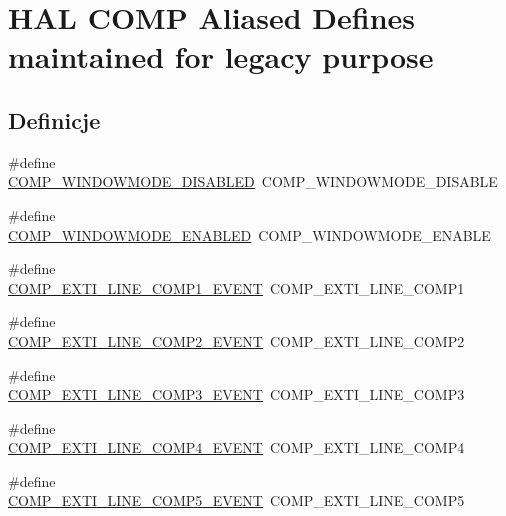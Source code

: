 \hypertarget{group___h_a_l___c_o_m_p___aliased___defines}{}\section{H\+AL C\+O\+MP Aliased Defines maintained for legacy purpose}
\label{group___h_a_l___c_o_m_p___aliased___defines}
\subsection*{Definicje}
\begin{DoxyCompactItemize}
\item 
\#define \hyperlink{group___h_a_l___c_o_m_p___aliased___defines_gab9e0400639ad2179b63e519e08741c05}{C\+O\+M\+P\+\_\+\+W\+I\+N\+D\+O\+W\+M\+O\+D\+E\+\_\+\+D\+I\+S\+A\+B\+L\+ED}~C\+O\+M\+P\+\_\+\+W\+I\+N\+D\+O\+W\+M\+O\+D\+E\+\_\+\+D\+I\+S\+A\+B\+LE
\item 
\#define \hyperlink{group___h_a_l___c_o_m_p___aliased___defines_gab481c80a4a4235ca54d2dd39db70926c}{C\+O\+M\+P\+\_\+\+W\+I\+N\+D\+O\+W\+M\+O\+D\+E\+\_\+\+E\+N\+A\+B\+L\+ED}~C\+O\+M\+P\+\_\+\+W\+I\+N\+D\+O\+W\+M\+O\+D\+E\+\_\+\+E\+N\+A\+B\+LE
\item 
\#define \hyperlink{group___h_a_l___c_o_m_p___aliased___defines_gaa53df1592afaa8d2a7d2f417273a50a7}{C\+O\+M\+P\+\_\+\+E\+X\+T\+I\+\_\+\+L\+I\+N\+E\+\_\+\+C\+O\+M\+P1\+\_\+\+E\+V\+E\+NT}~C\+O\+M\+P\+\_\+\+E\+X\+T\+I\+\_\+\+L\+I\+N\+E\+\_\+\+C\+O\+M\+P1
\item 
\#define \hyperlink{group___h_a_l___c_o_m_p___aliased___defines_gae128dfe3b90b2c0e51cde7de5987f9ef}{C\+O\+M\+P\+\_\+\+E\+X\+T\+I\+\_\+\+L\+I\+N\+E\+\_\+\+C\+O\+M\+P2\+\_\+\+E\+V\+E\+NT}~C\+O\+M\+P\+\_\+\+E\+X\+T\+I\+\_\+\+L\+I\+N\+E\+\_\+\+C\+O\+M\+P2
\item 
\#define \hyperlink{group___h_a_l___c_o_m_p___aliased___defines_ga30c7118ab9b9cbfa8e40870ee9e747b6}{C\+O\+M\+P\+\_\+\+E\+X\+T\+I\+\_\+\+L\+I\+N\+E\+\_\+\+C\+O\+M\+P3\+\_\+\+E\+V\+E\+NT}~C\+O\+M\+P\+\_\+\+E\+X\+T\+I\+\_\+\+L\+I\+N\+E\+\_\+\+C\+O\+M\+P3
\item 
\#define \hyperlink{group___h_a_l___c_o_m_p___aliased___defines_ga7e682dbcdc2deedaa2b2854b7256b742}{C\+O\+M\+P\+\_\+\+E\+X\+T\+I\+\_\+\+L\+I\+N\+E\+\_\+\+C\+O\+M\+P4\+\_\+\+E\+V\+E\+NT}~C\+O\+M\+P\+\_\+\+E\+X\+T\+I\+\_\+\+L\+I\+N\+E\+\_\+\+C\+O\+M\+P4
\item 
\#define \hyperlink{group___h_a_l___c_o_m_p___aliased___defines_gad0def6714ebe83bd131d6f62f12bf6b7}{C\+O\+M\+P\+\_\+\+E\+X\+T\+I\+\_\+\+L\+I\+N\+E\+\_\+\+C\+O\+M\+P5\+\_\+\+E\+V\+E\+NT}~C\+O\+M\+P\+\_\+\+E\+X\+T\+I\+\_\+\+L\+I\+N\+E\+\_\+\+C\+O\+M\+P5

\end{DoxyCompactItemize}
